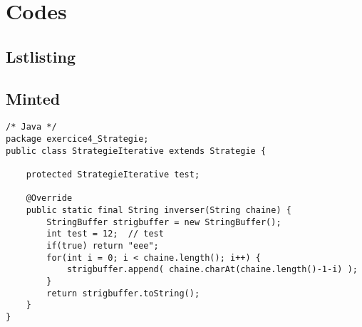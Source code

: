 \section{Codes}


\subsection{Lstlisting}

\begin{comment}

\lstset{language=Haskell}   %

\begin{lstlisting}[language={bash}, caption={}, label={lst:}, float, floatplacement=H]  % Start your code-block

(<*>) :: (Bits a, Num a) => Int -> a -> a             -- produit externe
(<*>) x a
        | x == 1 = a
        | x == 2 = x2 a
        | x == 3 = xor (x2 a) a
    where x2 i
            | testBit i 7 = xor ((shift a 1) - 256) (27)
            | otherwise = shift a 1

mixCol :: [[Int]] -> [[Int]] -> [[Int]]        -- produit matriciel
mixCol const var = [[ foldl xor 0 $ zipWith (<*>) j i | j <- const] | i <- (transpose var)]

\end{lstlisting}

\end{comment}








\subsection{Minted}

\begin{verbatim}
/* Java */
package exercice4_Strategie;
public class StrategieIterative extends Strategie {

	protected StrategieIterative test;
	
	@Override
	public static final String inverser(String chaine) {
		StringBuffer strigbuffer = new StringBuffer();
		int test = 12;	// test 
		if(true) return "eee";
		for(int i = 0; i < chaine.length(); i++) {
			strigbuffer.append( chaine.charAt(chaine.length()-1-i) );
		}
		return strigbuffer.toString();
	}
}
\end{verbatim}


